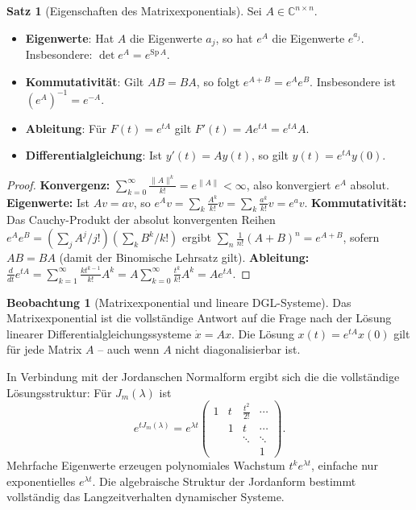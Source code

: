 ﻿\documentclass[a4paper,12pt]{report}
\theoremstyle{definition}
\newtheorem{satz}{Satz}
\newtheorem{beobachtung}{Beobachtung}
\begin{document}
\begin{satz}[Eigenschaften des Matrixexponentials]
    Sei $A \in \mathbb{C}^{n \times n}$.
    \begin{itemize}
        \item[-] \textbf{Eigenwerte}: Hat $A$ die Eigenwerte $a_j$, so hat
              $e^A$ die Eigenwerte $e^{a_j}$. Insbesondere:
              $\det e^A = e^{\mathrm{Sp}\, A}$.
        \item[-] \textbf{Kommutativität}: Gilt $AB = BA$, so folgt
              $e^{A+B} = e^A e^B$. Insbesondere ist $(e^A)^{-1} = e^{-A}$.
        \item[-] \textbf{Ableitung}: Für $F(t) = e^{tA}$ gilt
              $F'(t) = A e^{tA} = e^{tA} A$.
        \item[-] \textbf{Differentialgleichung}: Ist $y'(t) = Ay(t)$,
              so gilt $y(t) = e^{tA} y(0)$.
    \end{itemize}
\end{satz}
\begin{proof}
    \textbf{Konvergenz:} $\sum_{k=0}^\infty \frac{\|A\|^k}{k!} = e^{\|A\|} < \infty$,
    also konvergiert $e^A$ absolut.
    \textbf{Eigenwerte:} Ist $Av = av$, so $e^A v = \sum_k \frac{A^k}{k!} v
    = \sum_k \frac{a^k}{k!} v = e^a v$.
    \textbf{Kommutativität:} Das Cauchy-Produkt der absolut konvergenten Reihen
    $e^A e^B = (\sum_j A^j/j!)(\sum_k B^k/k!)$ ergibt $\sum_n \frac{1}{n!}(A+B)^n = e^{A+B}$,
    sofern $AB = BA$ (damit der Binomische Lehrsatz gilt).
    \textbf{Ableitung:} $\frac{d}{dt} e^{tA} = \sum_{k=1}^\infty \frac{k t^{k-1}}{k!} A^k
    = A \sum_{k=0}^\infty \frac{t^k}{k!} A^k = A e^{tA}$.
\end{proof}


\begin{beobachtung}[Matrixexponential und lineare DGL-Systeme]
    Das Matrixexponential ist die vollständige Antwort auf die Frage nach
    der Lösung linearer Differentialgleichungssysteme $\dot{x} = Ax$.
    Die Lösung $x(t) = e^{tA} x(0)$ gilt für jede Matrix $A$ --
    auch wenn $A$ nicht diagonalisierbar ist.

    In Verbindung mit der Jordanschen Normalform ergibt sich die
    die vollständige Lösungsstruktur: Für $J_m(\lambda)$
    ist
    \[
        e^{tJ_m(\lambda)} = e^{\lambda t}
        \begin{pmatrix}
            1 & t & \frac{t^2}{2!} & \cdots \\
              & 1 & t & \cdots \\
              & & \ddots & \ddots \\
              & & & 1
        \end{pmatrix}.
    \]
    Mehrfache Eigenwerte erzeugen polynomiales Wachstum $t^k e^{\lambda t}$,
    einfache nur exponentielles $e^{\lambda t}$. Die algebraische Struktur
    der Jordanform bestimmt vollständig das Langzeitverhalten dynamischer
    Systeme.
\end{beobachtung}
\end{document}
